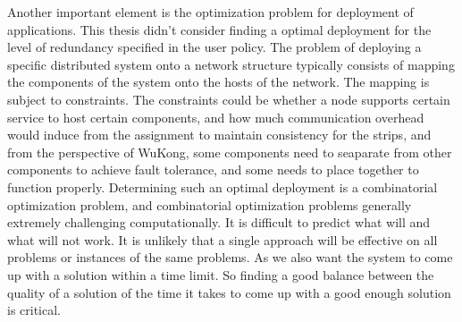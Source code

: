Another important element is the optimization problem for deployment of
applications. This thesis didn't consider finding a optimal deployment for the
level of redundancy specified in the user policy. The problem of deploying
a specific distributed system onto a network structure typically consists of
mapping the components of the system onto the hosts of the network. The mapping
is subject to constraints. The constraints could be whether a node supports
certain service to host certain components, and how much communication overhead
would induce from the assignment to maintain consistency for the strips, and
from the perspective of WuKong, some components need to seaparate from other
components to achieve fault tolerance, and some needs to place together to
function properly.  Determining such an optimal deployment is a combinatorial
optimization problem, and combinatorial optimization problems generally
extremely challenging computationally. It is difficult to predict what will and
what will not work.  It is unlikely that a single approach will be effective on
all problems or instances of the same problems. As we also want the system to
come up with a solution within a time limit. So finding a good balance between
the quality of a solution of the time it takes to come up with a good enough
solution is critical.
